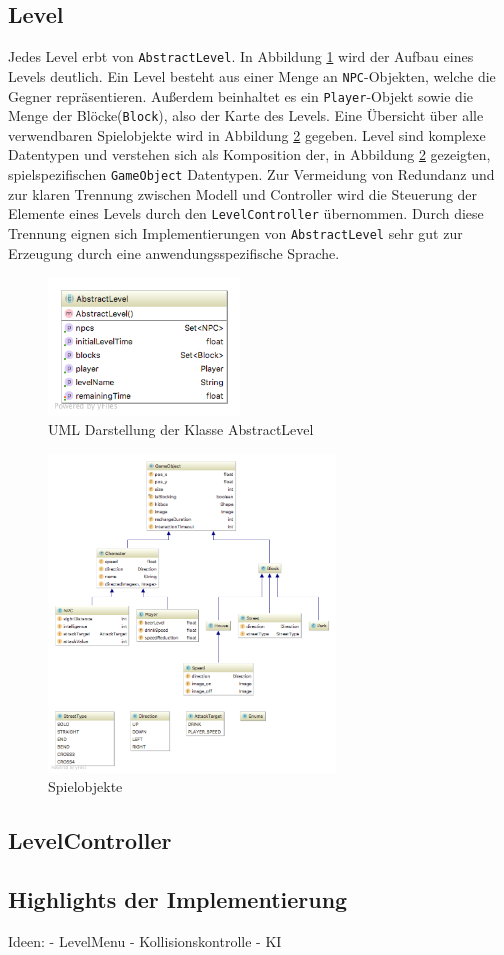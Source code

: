 \subsection{Level}

Jedes Level erbt von \texttt{AbstractLevel}.
In Abbildung \ref{fig:spielarchitektur:abstractlevel} wird der Aufbau eines Levels deutlich.
Ein Level besteht aus einer Menge an \texttt{NPC}-Objekten, welche die Gegner repräsentieren.
Außerdem beinhaltet es ein \texttt{Player}-Objekt sowie die Menge der Blöcke(\texttt{Block}), also der Karte des Levels.
Eine Übersicht über alle verwendbaren Spielobjekte wird in Abbildung \ref{fig:spielarchitektur:model} gegeben.
Level sind komplexe Datentypen und verstehen sich als Komposition der, in Abbildung \ref{fig:spielarchitektur:model} gezeigten, spielspezifischen \texttt{GameObject} Datentypen.
Zur Vermeidung von Redundanz und zur klaren Trennung zwischen Modell und Controller wird die Steuerung der Elemente eines Levels durch den \texttt{LevelController} übernommen.
Durch diese Trennung eignen sich Implementierungen von \texttt{AbstractLevel} sehr gut zur Erzeugung durch eine anwendungsspezifische Sprache.

\begin{figure}[]
\centering
\includegraphics[width=2in]{img/05_abstractlevel_uml.png}
\caption{UML Darstellung der Klasse AbstractLevel}
\label{fig:spielarchitektur:abstractlevel}
\end{figure}

\begin{figure}[]
\centering
\includegraphics[width=3in]{img/05_model.png}
\caption{Spielobjekte}
\label{fig:spielarchitektur:model}
\end{figure}

\subsection{LevelController}

\subsection{Highlights der Implementierung}

Ideen:
- LevelMenu
- Kollisionskontrolle
- KI